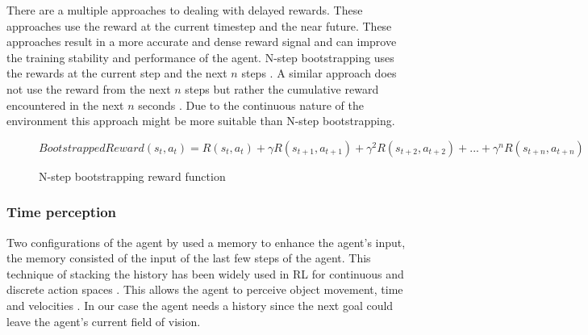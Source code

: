 There are a multiple approaches to dealing with delayed rewards. These approaches use the reward at the current timestep and the near future. These approaches result in a more accurate and dense reward signal and can improve the training stability and performance of the agent.
N-step bootstrapping uses the rewards at the current step and the next \(n\) steps \autocite{nstepbootstrapping}.
A similar approach does not use the reward from the next \(n\) steps but rather the cumulative reward encountered in the next \(n\) seconds \autocite{trackmania}. Due to the continuous nature of the environment this approach might be more suitable than N-step bootstrapping.




\begin{figure}
     \[BootstrappedReward(s_t,a_t) = R(s_t,a_t) + \gamma R(s_{t+1},a_{t+1}) + \gamma^2 R(s_{t+2},a_{t+2}) + ... + \gamma^n R(s_{t+n},a_{t+n})\]
     \caption{N-step bootstrapping reward function \autocite{nstepbootstrapping}}
\end{figure}


\subsubsection{Time perception}

Two configurations of the agent by \autocite{maximilian} used a memory to enhance the agent's input, the memory consisted of the input of the last few steps of the agent. This technique of stacking the history has been widely used in RL for continuous \autocite{atari} and discrete action spaces \autocite{alphago}. This allows the agent to perceive object movement, time and velocities \autocite{atari}.
In our case the agent needs a history since the next goal could leave the agent's current field of vision.


